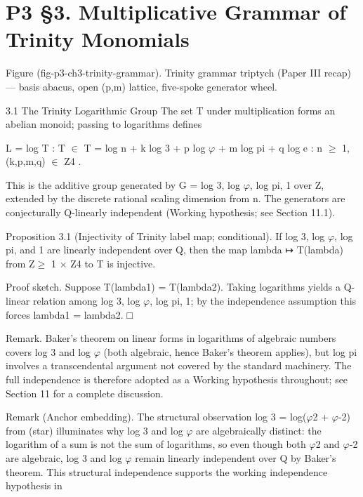 
\section{P3 §3. Multiplicative Grammar of Trinity Monomials}

Figure (fig-p3-ch3-trinity-grammar). Trinity grammar triptych (Paper III recap) --- basis abacus,
                              open (p,m) lattice, five-spoke generator wheel.

  3.1 The Trinity Logarithmic Group
  The set T under multiplication forms an abelian monoid; passing to logarithms defines

  L = { log T : T $\in$ T } = { log n + k log 3 + p log $\varphi$ + m log pi + q log e : n $\geq$ 1, (k,p,m,q)
  $\in$ Z4 }.

  This is the additive group generated by G = { log 3, log $\varphi$, log pi, 1 } over Z, extended
  by the discrete rational scaling dimension from n. The generators are conjecturally
  Q-linearly independent (Working hypothesis; see Section 11.1).

        Proposition 3.1 (Injectivity of Trinity label map; conditional). If log 3, log $\varphi$,
        log pi, and 1 are linearly independent over Q, then the map lambda ↦ T(lambda)
        from Z$\geq$ 1 $\times$ Z4 to T is injective.

  Proof sketch. Suppose T(lambda1) = T(lambda2). Taking logarithms yields a Q-linear
  relation among log 3, log $\varphi$, log pi, 1; by the independence assumption this forces
  lambda1 = lambda2. □

        Remark. Baker's theorem on linear forms in logarithms of algebraic numbers
        covers log 3 and log $\varphi$ (both algebraic, hence Baker's theorem applies), but log pi
        involves a transcendental argument not covered by the standard machinery. The
        full independence is therefore adopted as a Working hypothesis throughout; see
        Section 11 for a complete discussion.

        Remark (Anchor embedding). The structural observation log 3 = log($\varphi$2 + $\varphi$-2)
        from (star) illuminates why log 3 and log $\varphi$ are algebraically distinct: the logarithm
        of a sum is not the sum of logarithms, so even though both $\varphi$2 and $\varphi$-2 are
        algebraic, log 3 and log $\varphi$ remain linearly independent over Q by Baker's theorem.
        This structural independence supports the working independence hypothesis in

